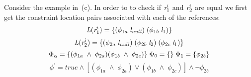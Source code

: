 Consider the example in~(c). In order to to check
if $\emph{r}_1^i$ and $\emph{r}_2^i$ are equal we first get the constraint location
pairs associated with each of the references:
\[
\emph{L}(\emph{r}_1^i) = \{ (\phi_{1a}\; \emph{l}_\mathit{null})\; (\phi_{1b}\; \emph{l}_1) \} 
\]
\[
\emph{L}(\emph{r}_2^i) = \{ (\phi_{2a}\; \emph{l}_\mathit{null})\; (\phi_{2b}\; \emph{l}_2)\; (\phi_{2c}\; \emph{l}_1) \} \\
\]
\[
\Phi_\alpha = \{ (\phi_{1a}\; \wedge\; \phi_{2a} ) (\phi_{1b}\; \wedge\; \phi_{2c} ) \}\;
\Phi_0 = \{ \}\; \Phi_1 = \{ \phi_{2b}\} \\
\]
\[
\phi^\prime = \mathit{true} \wedge [ (\phi_{1a}\; \wedge\; \phi_{2a} )\vee (\phi_{1b}\; \wedge\; \phi_{2c} ) ] \wedge \neg\phi_{2b} 
\]
